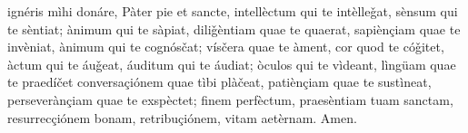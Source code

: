 ignéris mìhi donáre, Pàter pie et sancte, intellèctum qui te intèlleǧat, sènsum qui te sèntiat; ànimum qui te sàpiat, diliǧèntiam quae te quaerat, sapiènçiam quae te invèniat, ànimum qui te cognósčat; vísčera quae te àment, cor quod te cóǧitet, àctum qui te áuǧeat, áuditum qui te áudiat; òculos qui te vìdeant, lìngüam quae te praedíčet conversaçiónem quae tìbi plàčeat, patiènçiam quae te sustìneat, perseverànçiam quae te exspèctet; finem perfèctum, praesèntiam tuam sanctam, resurrecçiónem bonam, retribuçiónem, vitam aetèrnam. Amen. 
